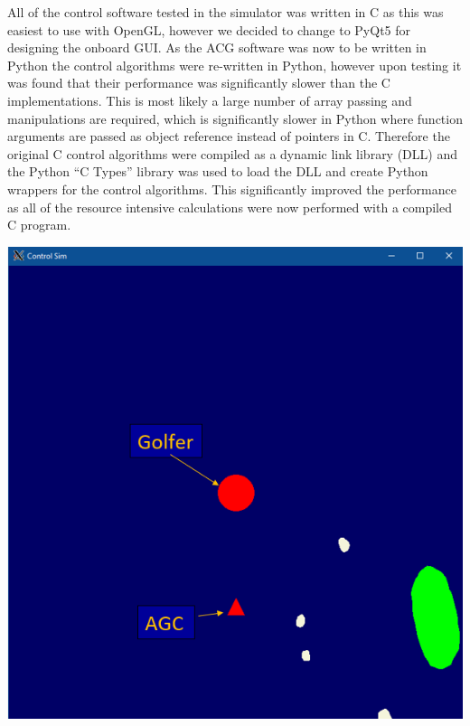 \documentclass[11pt,landscape]{article}
\newenvironment{Figure}
  {\par\medskip\noindent\minipage{\linewidth}}
  {\endminipage\par\medskip}
\begin{document}
\begin{multicols}{3}
All of the control software tested in the simulator was written in C as this was
easiest to use with OpenGL, however we decided to change to PyQt5 for designing
the onboard GUI. As the ACG software was now to be written in Python the control
algorithms were re-written in Python, however upon testing it was found that
their performance was significantly slower than the C implementations. This is
most likely a large number of array passing and manipulations are required,
which is significantly slower in Python where function arguments are passed as
object reference instead of pointers in C. Therefore the original C control
algorithms were compiled as a dynamic link library (DLL) and the Python ``C
Types'' library was used to load the DLL and create Python wrappers for the
control algorithms. This significantly improved the performance as all of the
resource intensive calculations were now performed with a compiled C program.

\begin{Figure}
    \begin{center}
        \includegraphics[width=\textwidth]{simulator.png}
    \end{center}
    \label{fig:simulator}
\end{Figure}


\end{multicols}
\end{document}
